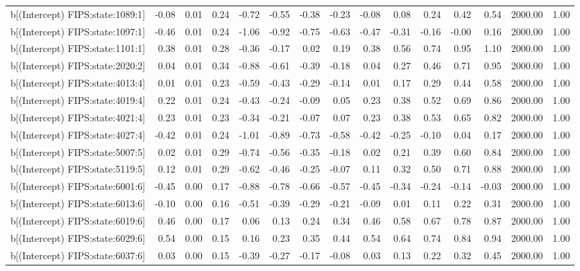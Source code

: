 \begin{table}[ht]
\begin{tabular}{rrrrrrrrrrrrrrr}
  b[(Intercept) FIPS:state:1089:1] & -0.08 & 0.01 & 0.24 & -0.72 & -0.55 & -0.38 & -0.23 & -0.08 & 0.08 & 0.24 & 0.42 & 0.54 & 2000.00 & 1.00 \\ 
  b[(Intercept) FIPS:state:1097:1] & -0.46 & 0.01 & 0.24 & -1.06 & -0.92 & -0.75 & -0.63 & -0.47 & -0.31 & -0.16 & -0.00 & 0.16 & 2000.00 & 1.00 \\ 
  b[(Intercept) FIPS:state:1101:1] & 0.38 & 0.01 & 0.28 & -0.36 & -0.17 & 0.02 & 0.19 & 0.38 & 0.56 & 0.74 & 0.95 & 1.10 & 2000.00 & 1.00 \\ 
  b[(Intercept) FIPS:state:2020:2] & 0.04 & 0.01 & 0.34 & -0.88 & -0.61 & -0.39 & -0.18 & 0.04 & 0.27 & 0.46 & 0.71 & 0.95 & 2000.00 & 1.00 \\ 
  b[(Intercept) FIPS:state:4013:4] & 0.01 & 0.01 & 0.23 & -0.59 & -0.43 & -0.29 & -0.14 & 0.01 & 0.17 & 0.29 & 0.44 & 0.58 & 2000.00 & 1.00 \\ 
  b[(Intercept) FIPS:state:4019:4] & 0.22 & 0.01 & 0.24 & -0.43 & -0.24 & -0.09 & 0.05 & 0.23 & 0.38 & 0.52 & 0.69 & 0.86 & 2000.00 & 1.00 \\ 
  b[(Intercept) FIPS:state:4021:4] & 0.23 & 0.01 & 0.23 & -0.34 & -0.21 & -0.07 & 0.07 & 0.23 & 0.38 & 0.53 & 0.65 & 0.82 & 2000.00 & 1.00 \\ 
  b[(Intercept) FIPS:state:4027:4] & -0.42 & 0.01 & 0.24 & -1.01 & -0.89 & -0.73 & -0.58 & -0.42 & -0.25 & -0.10 & 0.04 & 0.17 & 2000.00 & 1.00 \\ 
  b[(Intercept) FIPS:state:5007:5] & 0.02 & 0.01 & 0.29 & -0.74 & -0.56 & -0.35 & -0.18 & 0.02 & 0.21 & 0.39 & 0.60 & 0.84 & 2000.00 & 1.00 \\ 
  b[(Intercept) FIPS:state:5119:5] & 0.12 & 0.01 & 0.29 & -0.62 & -0.46 & -0.25 & -0.07 & 0.11 & 0.32 & 0.50 & 0.71 & 0.88 & 2000.00 & 1.00 \\ 
  b[(Intercept) FIPS:state:6001:6] & -0.45 & 0.00 & 0.17 & -0.88 & -0.78 & -0.66 & -0.57 & -0.45 & -0.34 & -0.24 & -0.14 & -0.03 & 2000.00 & 1.00 \\ 
  b[(Intercept) FIPS:state:6013:6] & -0.10 & 0.00 & 0.16 & -0.51 & -0.39 & -0.29 & -0.21 & -0.09 & 0.01 & 0.11 & 0.22 & 0.31 & 2000.00 & 1.00 \\ 
  b[(Intercept) FIPS:state:6019:6] & 0.46 & 0.00 & 0.17 & 0.06 & 0.13 & 0.24 & 0.34 & 0.46 & 0.58 & 0.67 & 0.78 & 0.87 & 2000.00 & 1.00 \\ 
  b[(Intercept) FIPS:state:6029:6] & 0.54 & 0.00 & 0.15 & 0.16 & 0.23 & 0.35 & 0.44 & 0.54 & 0.64 & 0.74 & 0.84 & 0.94 & 2000.00 & 1.00 \\ 
  b[(Intercept) FIPS:state:6037:6] & 0.03 & 0.00 & 0.15 & -0.39 & -0.27 & -0.17 & -0.08 & 0.03 & 0.13 & 0.22 & 0.32 & 0.45 & 2000.00 & 1.00 \\ 

\end{tabular}
\end{table}
